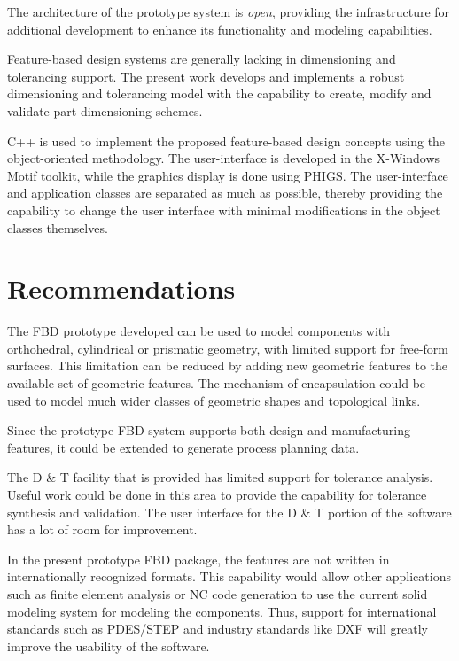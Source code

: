 	The architecture of the prototype system is {\em open}, providing the
	infrastructure for additional development to enhance its functionality and 
	modeling capabilities.

	Feature-based design systems are generally lacking in
    dimensioning and tolerancing support. The present work develops and
    implements a robust dimensioning and tolerancing model with the capability
	to  create, modify and validate part dimensioning schemes.


	C++ is used to implement the proposed feature-based design concepts
	using the object-oriented methodology. 
	The user-interface is developed in the X-Windows Motif toolkit, while the
	graphics display is done using PHIGS.
	The user-interface and application classes are separated as much as
	possible, thereby providing the capability to change the user interface
	with minimal modifications in the object classes themselves.


    \section{Recommendations}

	The FBD prototype developed can be used to model components with
	orthohedral, cylindrical or prismatic geometry, with limited support
	for free-form surfaces. This limitation can be reduced by adding new
	geometric features to the available set of geometric features. The
	mechanism of encapsulation could be used to model much wider classes of
	geometric shapes and topological links.

	Since the prototype FBD system supports both design and manufacturing 
	features, it could be extended to generate process planning data.

	The D \& T facility that is provided has limited support for tolerance 
	analysis. Useful work could be done in this area to provide the capability 
	for tolerance synthesis and validation. The user interface for the D \& T 
	portion of the software has a lot of room for improvement.

	In the present prototype FBD package, the features are not written
	in internationally recognized formats. This capability would allow
	other applications such as finite element analysis or NC code generation
	to use the current solid modeling system for modeling the components.
	Thus, support for international standards such as PDES/STEP and industry
	standards like DXF will greatly improve the usability of the software.

